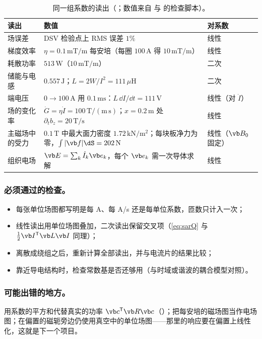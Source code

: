 \begin{table}[htbp]\centering\small
\caption{同一组系数的读出（；数值来自 与 的检查脚本）。}\label{tab:projects-readouts}
\begin{tabularx}{\linewidth}{@{}>{\raggedright\arraybackslash}p{.2\linewidth} Y >{\raggedright\arraybackslash}p{.15\linewidth}@{}}
\toprule
读出 & 数值 & 对系数\\\midrule
场误差 & DSV 检验点上 RMS 误差 $1\%$ & 线性\\
梯度效率 & $\eta=0.1\,\mathrm{mT/m}$ 每安培（每圈 $100\,\mathrm A$ 得 $10\,\mathrm{mT/m}$） & 线性\\
耗散功率 & $513\,\mathrm W$（$10\,\mathrm{mT/m}$） & 二次\\
储能与电感 & $0.557\,\mathrm J$；$L=2W/I^2=111\,\mu\mathrm H$ & 二次\\
端电压 & $0\to100\,\mathrm A$ 用 $0.1\,\mathrm{ms}$：$L\,\dd I/\dd t=111\,\mathrm V$ & 线性（对 $\dot I$）\\
场的变化率 & $\dot G=\eta\dot I=100\,\mathrm{T/(m\,s)}$；$x=0.2\,\mathrm m$ 处 $\partial_tb_z=20\,\mathrm{T/s}$ & 线性\\
主磁场中的受力 & $0.1\,\mathrm T$ 中最大面力密度 $1.72\,\mathrm{kN/m^2}$；每块板净力为零，$\int|\vb f|\dS=202\,\mathrm N$ & 线性（$\vb B_0$ 固定）\\
组织电场 & $\vb E=\sum_k\dot I_k\vb e_k$，每个 $\vb e_k$ 需一次导体求解 & 线性\\
\bottomrule
\end{tabularx}
\end{table}

\subsubsection{必须通过的检查。}
\begin{itemize}[label=$\mdlgwhtsquare$]
\item 每张单位场图都写明是每 A、每 A/s 还是每单位系数，匝数只计入一次；
\item 线性读出用单位场图叠加，二次读出保留交叉项（\eqref{eq:sarQ} 与 $\tfrac12\vb I^{\mathsf T}\vb L\vb I$ 同理）；
\item 离散成绕组之后，重新计算全部读出，并与电流片的结果比较；
\item 靠近导电结构时，检查常数基是否还够用（与时域或谐波的耦合模型对照）。
\end{itemize}

\subsubsection{可能出错的地方。}
用系数的平方和代替真实的功率 $\vb c^{\mathsf T}\vb R\vb c$（）；把每安培的磁场图当作电场图；在偏置的磁轭旁边仍使用真空中的单位场图——那里的响应要在偏置上线性化，这就是下一个项目。

